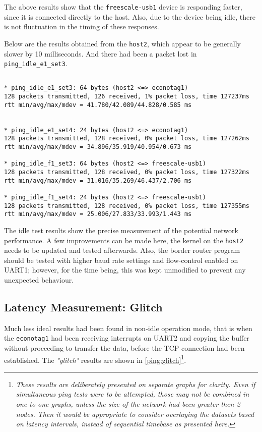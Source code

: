   The above results show that the \texttt{freescale-usb1} device is
 responding faster, since it is connected directly to the host.
 Also, due to the device being idle, there is not fluctuation in
 the timing of these responses.

 Below are the results obtained from the \texttt{host2}, which
 appear to be generally slower by 10 milliseconds. And there
 had been a packet lost in \texttt{ping\_idle\_e1\_set3}.

\begin{verbatim}

* ping_idle_e1_set3: 64 bytes (host2 <=> econotag1)
128 packets transmitted, 126 received, 1% packet loss, time 127237ms
rtt min/avg/max/mdev = 41.780/42.089/44.828/0.585 ms


* ping_idle_e1_set4: 24 bytes (host2 <=> econotag1)
128 packets transmitted, 128 received, 0% packet loss, time 127262ms
rtt min/avg/max/mdev = 34.896/35.919/40.954/0.673 ms

* ping_idle_f1_set3: 64 bytes (host2 <=> freescale-usb1)
128 packets transmitted, 128 received, 0% packet loss, time 127322ms
rtt min/avg/max/mdev = 31.016/35.269/46.437/2.706 ms

* ping_idle_f1_set4: 24 bytes (host2 <=> freescale-usb1)
128 packets transmitted, 128 received, 0% packet loss, time 127355ms
rtt min/avg/max/mdev = 25.006/27.833/33.993/1.443 ms

\end{verbatim}

  The idle test results show the precise measurement of the potential
 network performance. A few improvements can be made here, the kernel
 on the \texttt{host2} needs to be updated and tested afterwards. Also,
 the border router program should be tested with higher baud rate
 settings and flow-control enabled on UART1; however, for the time being,
 this was kept unmodified to prevent any unexpected behaviour.

\subsection{Latency Measurement: Glitch}

  Much less ideal results had been found in non-idle operation mode,
 that is when the \texttt{econotag1} had been receiving interrupts
 on UART2 and copying the buffer without proceeding to transfer the
 data, before the TCP connection had been established. The \emph{"glitch"}
 results are shown in \ref{ping:glitch}\footnote{\emph{%
 These results are deliberately presented on separate graphs for clarity.
 Even if simultaneous ping tests were to be attempted, those may not be
 combined in one-to-one graphs, unless the size of the network had been
 greater then 2 nodes. Then it would be appropriate to consider overlaying
 the datasets based on latency intervals, instead of sequential timebase
 as presented here.}}.

